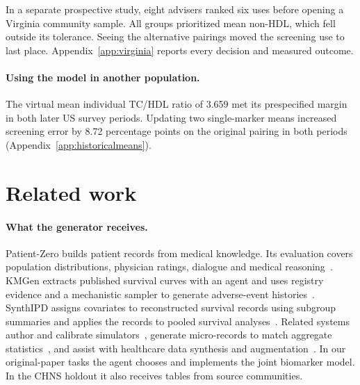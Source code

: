 \documentclass[sigconf,anonymous,review]{acmart}
\begin{document}
In a separate prospective study, eight advisers ranked six uses before opening a Virginia community sample. All groups prioritized mean non-HDL, which fell outside its tolerance. Seeing the alternative pairings moved the screening use to last place. Appendix~\ref{app:virginia} reports every decision and measured outcome.

\paragraph{Using the model in another population.}
The virtual mean individual TC/HDL ratio of 3.659 met its prespecified margin in both later US survey periods. Updating two single-marker means increased screening error by 8.72 percentage points on the original pairing in both periods (Appendix~\ref{app:historicalmeans}).

\section{Related work}
\paragraph{What the generator receives.}
Patient-Zero builds patient records from medical knowledge. Its evaluation covers population distributions, physician ratings, dialogue and medical reasoning~\cite{patientzero}. KMGen extracts published survival curves with an agent and uses registry evidence and a mechanistic sampler to generate adverse-event histories~\cite{kmgen}. SynthIPD assigns covariates to reconstructed survival records using subgroup summaries and applies the records to pooled survival analyses~\cite{synthipd}. Related systems author and calibrate simulators~\cite{gsim}, generate micro-records to match aggregate statistics~\cite{llmsynthor}, and assist with healthcare data synthesis and augmentation~\cite{synthcraft}. In our original-paper tasks the agent chooses and implements the joint biomarker model. In the CHNS holdout it also receives tables from source communities.
\end{document}
